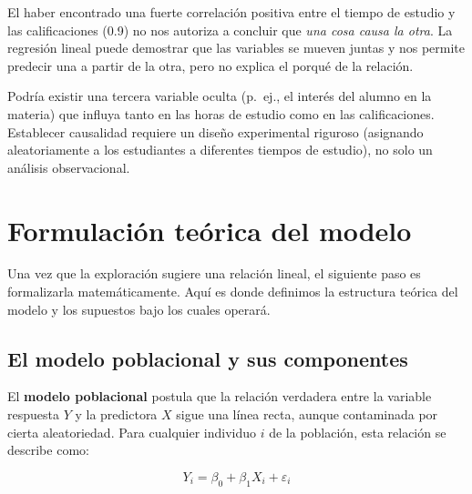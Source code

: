 \documentclass[
  letterpaper,
  DIV=11,
  numbers=noendperiod]{scrreprt}
\begin{document}
\begin{tcolorbox}[enhanced jigsaw, leftrule=.75mm, breakable, colbacktitle=quarto-callout-warning-color!10!white, bottomrule=.15mm, colframe=quarto-callout-warning-color-frame, toprule=.15mm, colback=white, coltitle=black, bottomtitle=1mm, left=2mm, title=\textcolor{quarto-callout-warning-color}{\faExclamationTriangle}\hspace{0.5em}{¡Correlación no implica causalidad!}, opacityback=0, arc=.35mm, opacitybacktitle=0.6, toptitle=1mm, titlerule=0mm, rightrule=.15mm]

El haber encontrado una fuerte correlación positiva entre el tiempo de
estudio y las calificaciones (0.9) no nos autoriza a concluir que
\emph{una cosa causa la otra}. La regresión lineal puede demostrar que
las variables se mueven juntas y nos permite predecir una a partir de la
otra, pero no explica el porqué de la relación.

Podría existir una tercera variable oculta (p.~ej., el interés del
alumno en la materia) que influya tanto en las horas de estudio como en
las calificaciones. Establecer causalidad requiere un diseño
experimental riguroso (asignando aleatoriamente a los estudiantes a
diferentes tiempos de estudio), no solo un análisis observacional.

\end{tcolorbox}

\section{Formulación teórica del
modelo}\label{formulaciuxf3n-teuxf3rica-del-modelo}

Una vez que la exploración sugiere una relación lineal, el siguiente
paso es formalizarla matemáticamente. Aquí es donde definimos la
estructura teórica del modelo y los supuestos bajo los cuales operará.

\subsection{El modelo poblacional y sus
componentes}\label{el-modelo-poblacional-y-sus-componentes}

El \textbf{modelo poblacional} postula que la relación verdadera entre
la variable respuesta \(Y\) y la predictora \(X\) sigue una línea recta,
aunque contaminada por cierta aleatoriedad. Para cualquier individuo
\(i\) de la población, esta relación se describe como:

\[
Y_i = \beta_0 + \beta_1 X_i + \varepsilon_i
\]
\end{document}
